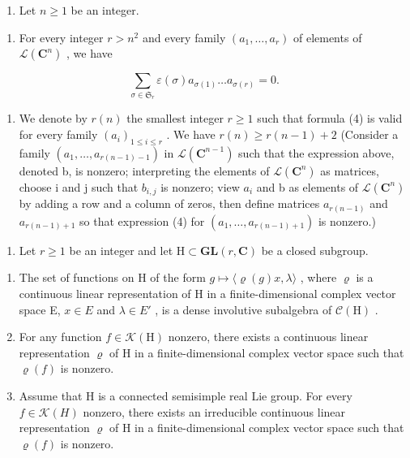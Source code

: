 \begin{enumerate}
\def\labelenumi{\arabic{enumi})}
\setcounter{enumi}{20}
\tightlist
\item
  Let \(n \geqslant 1\) be an integer.
\end{enumerate}

\begin{enumerate}
\def\labelenumi{\alph{enumi})}
\tightlist
\item
  For every integer \(r > n^{2}\) and every family \((a_{1}, \ldots, a_{r})\) of elements of \(\mathcal{L}(\mathbf{C}^{n})\) , we have
\end{enumerate}

\[
\sum_ {\sigma \in \mathfrak {S} _ {r}} \varepsilon (\sigma) a _ {\sigma (1)} \dots a _ {\sigma (r)} = 0.\tag{4}
\]

\begin{enumerate}
\def\labelenumi{\alph{enumi})}
\setcounter{enumi}{1}
\tightlist
\item
  We denote by \(r(n)\) the smallest integer \(r \geqslant 1\) such that formula (4) is valid for every family \((a_i)_{1 \leqslant i \leqslant r}\) . We have \(r(n) \geqslant r(n-1) + 2\) (Consider a family \((a_1, \ldots, a_{r(n-1)-1})\) in \(\mathcal{L}(\mathbf{C}^{n-1})\) such that the expression above, denoted b, is nonzero; interpreting the elements of \(\mathcal{L}(\mathbf{C}^n)\) as matrices, choose i and j such that \(b_{i,j}\) is nonzero; view \(a_i\) and b as elements of \(\mathcal{L}(\mathbf{C}^n)\) by adding a row and a column of zeros, then define matrices \(a_{r(n-1)}\) and \(a_{r(n-1)+1}\) so that expression (4) for \((a_1, \ldots, a_{r(n-1)+1})\) is nonzero.)
\end{enumerate}

\begin{enumerate}
\def\labelenumi{\arabic{enumi})}
\setcounter{enumi}{21}
\tightlist
\item
  Let \(r \geqslant 1\) be an integer and let \(\mathrm{H} \subset \mathbf{GL}(r, \mathbf{C})\) be a closed subgroup.
\end{enumerate}

\begin{enumerate}
\def\labelenumi{\alph{enumi})}
\item
  The set of functions on H of the form \(g \mapsto \langle \varrho(g)x, \lambda \rangle\) , where \(\varrho\) is a continuous linear representation of H in a finite-dimensional complex vector space E, \(x \in E\) and \(\lambda \in E'\) , is a dense involutive subalgebra of \(\mathcal{C}(\mathrm{H})\) .
\item
  For any function \(f \in \mathcal{K}(\mathrm{H})\) nonzero, there exists a continuous linear representation \(\varrho\) of H in a finite-dimensional complex vector space such that \(\varrho(f)\) is nonzero.
\item
  Assume that H is a connected semisimple real Lie group. For every \(f \in \mathcal{K}(H)\) nonzero, there exists an irreducible continuous linear representation \(\varrho\) of H in a finite-dimensional complex vector space such that \(\varrho(f)\) is nonzero.
\end{enumerate}


